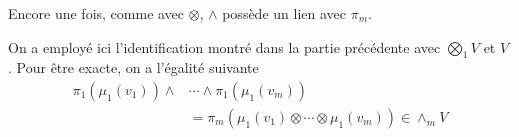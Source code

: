 \documentclass[../geometrie.tex]{subfiles}
\begin{document}
{		Encore une fois, comme avec $\otimes$, $\wedge$ possède un lien avec $\pi_{m}$.


		On a employé ici l'identification montré dans la partie précédente avec $\bigotimes_{1} V$ et $V$. Pour être exacte, on a l'égalité suivante
		$$
			\begin{aligned}
				\pi_{1}(\mu_{1}(v_{1})) \wedge & \cdots \wedge \pi_{1}(\mu_{1}(v_{m})) \\
				& = \pi_{m}(\mu_{1}(v_{1}) \otimes \cdots \otimes \mu_{1}(v_{m})) \in \wedge_{m} V
			\end{aligned}
		$$

		}
\end{document}
